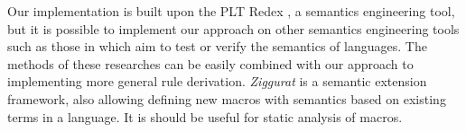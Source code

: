 Our implementation is built upon the PLT Redex \cite{SEwPR}, a semantics engineering tool, but it is possible to implement our approach on other semantics engineering tools such as those in \cite{dynsem,Ksemantic} which aim to test or verify the semantics of languages. The methods of these researches can be easily combined with our approach to implementing more general rule derivation. \emph{Ziggurat} \cite{Ziggurat} is a semantic extension framework, also allowing defining new macros with semantics based on existing terms in a language. It is should be useful for static analysis of macros.

